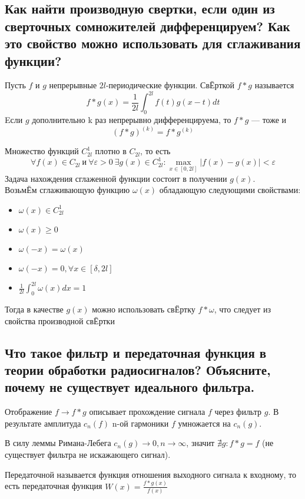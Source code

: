 \documentclass{article}
\begin{document}
\subsection{Как найти производную свертки, если один из сверточных сомножителей дифференцируем? Как это свойство можно использовать для сглаживания функции?}
Пусть $f$ и $g$ непрерывные $2l$-периодические функции. Св{\footnotesize Ё}рткой $f*g$ называется 
\[f*g(x) = \frac{1}{2l}\int_0^{2l}f(t)g(x-t)dt\]
Eсли $g$ дополнительно k раз непрерывно дифференцируема, то $f*g$ --- тоже и 
\[(f*g)^{(k)} = f*g^{(k)}\]

Множество функций $C_{2l}^1$ плотно в $ C_{2l} $, то есть 
\[ \forall f(x) \in C_{2l} \ \text{и} \ \forall \varepsilon > 0 \  \exists g(x) \in C_{2l}^1: \max_{x \in [0, 2l]}|f(x)-g(x)| < \varepsilon\]
Задача нахождения сглаженной функции состоит в получении $g(x)$.\\
Возьм{\footnotesize Ё}м сглаживающую функцию $\omega(x)$ обладающую следующими свойствами:
\begin{itemize}
	\item
	$\omega(x) \in C_{2l}^1$
	\item
	$\omega(x) \geq 0$
	\item
	$ \omega(-x)=\omega(x) $
	\item
	$ \omega(-x)=0, \forall x \in [\delta, 2l] $
	\item
	$\frac{1}{2l}\int_0^{2l}\omega(x)dx = 1$
\end{itemize}
Тогда в качестве $g(x)$ можно использовать св{\footnotesize Ё}ртку $f*\omega$, что следует из свойства производной св{\footnotesize Ё}ртки 



\subsection{Что такое фильтр и передаточная функция в теории обработки радиосигналов? Объясните, почему не существует идеального фильтра.}
Отображение $f \rightarrow f*g$ описывает прохождение сигнала $f$ через фильтр $g$. 
В результате амплитуда $c_n(f)$ n-ой гармоники $f$ умножается на $c_n(g)$.

В силу леммы Римана-Лебега $c_n(g)\rightarrow 0, n\rightarrow \infty$, значит $\nexists g: f*g=f$ (не существует фильтра не искажающего сигнал).

Передаточной называется функция отношения выходного сигнала к входному, то есть передаточная функция $ W(x) = \frac{f*g(x)}{f(x)} $ 
\end{document}
